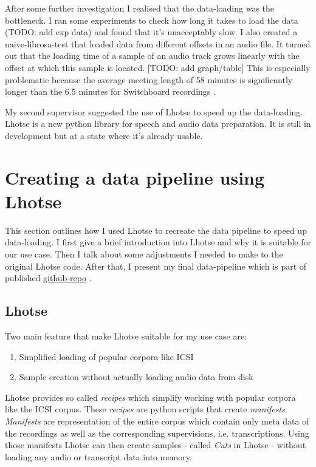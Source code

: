 \documentclass[bsc,frontabs,parskip,deptreport]{infthesis}
\newcommand{\coderepo}{\href{https://github.com/LasseWolter/laughter-detection-icsi}{github-repo} }
\begin{document}
After some further investigation I realised that the data-loading was the bottleneck. I ran some experiments to check how long it takes to load the data (TODO: add exp data) and found that it's unacceptably slow. 
I also created a naive-librosa-test that loaded data from different offsets in an audio file. It turned out that the loading time of a sample of an audio track grows linearly with the offset at which this sample is located. [TODO: add graph/table]
This is especially problematic because the average meeting length of 58 minutes \citep{icsi-ldc} is significantly longer than the 6.5 minutes for Switchboard recordings \citep{switchboard-ldc}.

My second supervisor suggested the use of Lhotse \citep{zelasko2021lhotse} to speed up the data-loading. Lhotse is a new python library for speech and audio data preparation. It is still in development but at a state where it's already usable.

\section{Creating a data pipeline using Lhotse}
This section outlines how I used Lhotse to recreate the data pipeline to speed up data-loading. I first give a brief introduction into Lhotse and why it is suitable for our use case. Then I talk about some adjustments I needed to make to the original Lhotse code. After that, I present my final data-pipeline which is part of published \coderepo.

\subsection{Lhotse} \label{sec:lhotse}
Two main feature that make Lhotse suitable for my use case are:
\begin{enumerate}
    \item Simplified loading of popular corpora like ICSI
    \item Sample creation without actually loading audio data from disk
\end{enumerate}

Lhotse provides so called \textit{recipes} which simplify working with popular corpora like the ICSI corpus.
These \textit{recipes} are python scripts that create \textit{manifests}.
\textit{Manifests} are representation of the entire corpus which contain only meta data of the recordings as well as the corresponding supervisions, i.e. transcriptions.
Using those manifests Lhotse can then create samples - called \textit{Cuts} in Lhotse - without loading any audio or transcript data into memory. 
\end{document}
